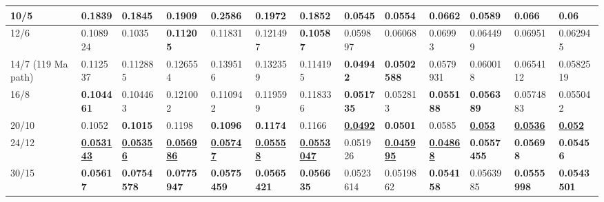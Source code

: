 \begin{landscape}
\begin{table*}
{\begin{tabular}{|l|l|l|l|l|l|l|l|l|l|l|l|l|}
10/5 & 0.1839 & 0.1845 & 0.1909 & 0.2586 & 0.1972 & 0.1852 &
  0.0545 & 0.0554 & 0.0662 & 0.0589 & 0.066 & 0.06 \\ \hline
12/6 & 0.108924 & 0.1035 & {\color[HTML]{34FF34} \textbf{0.11205}} & 0.11831 &
  0.121497 & {\color[HTML]{34FF34} \textbf{0.10587}} & 0.059897 & 0.06068 &
  0.06993 & 0.064499 & 0.06951 & 0.062945 \\ \hline
14/7 (119\textendash0 Ma path) & 0.112537 & 0.112885 & 0.126554 & 0.139516 &
  0.132359 & 0.114195 & {\color[HTML]{32CB00} \textbf{0.04942}} & {\color[HTML]{34FF34} \textbf{0.0502588}} & 0.0579931 & 0.060018 & 0.0654112 & 0.0582519 \\ \hline
16/8 & {\color[HTML]{34FF34} \textbf{0.104461}} & 0.104463 & 0.121002 &
  0.110942 & 0.119599 & 0.118336 & {\color[HTML]{34FF34} \textbf{0.051735}} &
  0.052813 & {\color[HTML]{34FF34} \textbf{0.055188}} & {\color[HTML]{34FF34} \textbf{0.056389}} & 0.0574883 & 0.055042 \\ \hline
20/10 & 0.1052 & {\color[HTML]{34FF34} \textbf{0.1015}} & 0.1198 &
  {\color[HTML]{34FF34} \textbf{0.1096}} & {\color[HTML]{34FF34}
  \textbf{0.1174}} & 0.1166 & {\color[HTML]{009901} {\ul\textbf{0.0492}}} &
  {\color[HTML]{32CB00} \textbf{0.0501}} & 0.0585 & {\color[HTML]{009901} {\ul\textbf{0.053}}} & {\color[HTML]{009901} {\ul\textbf{0.0536}}} & {\color[HTML]{009901} {\ul\textbf{0.052}}} \\ \hline
24/12 & {\color[HTML]{009901} {\ul\textbf{0.053143}}} & {\color[HTML]{009901}
  {\ul\textbf{0.05356}}} & {\color[HTML]{009901} {\ul\textbf{0.056986}}} &
  {\color[HTML]{009901} {\ul\textbf{0.05747}}} & {\color[HTML]{009901} {\ul\textbf{0.05558}}} & {\color[HTML]{009901} {\ul\textbf{0.0553047}}} &
  0.051926 & {\color[HTML]{009901} {\ul\textbf{0.045995}}} & {\color[HTML]{009901} {\ul\textbf{0.04868}}} &
  {\color[HTML]{32CB00} \textbf{0.0557455}} & {\color[HTML]{34FF34} \textbf{0.05698}} & {\color[HTML]{34FF34} \textbf{0.05456}} \\ \hline
30/15 & {\color[HTML]{32CB00} \textbf{0.05617}} & {\color[HTML]{32CB00}
  \textbf{0.0754578}} & {\color[HTML]{32CB00} \textbf{0.0775947}} &
  {\color[HTML]{32CB00} \textbf{0.0575459}} & {\color[HTML]{32CB00}
  \textbf{0.0565421}} & {\color[HTML]{32CB00} \textbf{0.056635}} & 0.0523614 &
  0.0519862 & {\color[HTML]{32CB00} \textbf{0.054158}} & 0.0563985 &
  {\color[HTML]{32CB00} \textbf{0.0555998}} & {\color[HTML]{32CB00} \textbf{0.0543501}} \\ \hline
\end{tabular}%
}
\resizebox{.7\width}{!}{%
}
\end{table*}
\end{landscape}
